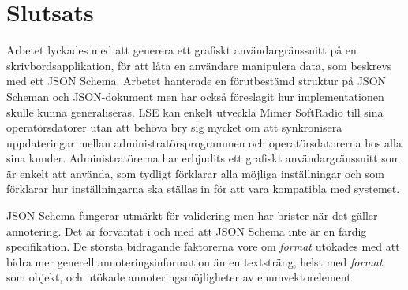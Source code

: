 \section{Slutsats}
\label{sec:slutsats:slutsats}
Arbetet lyckades med att generera ett grafiskt användargränssnitt på en skrivbordsapplikation, för att låta en användare manipulera data, som beskrevs med ett JSON Schema. Arbetet hanterade en förutbestämd struktur på JSON Scheman och JSON-dokument men har också föreslagit hur implementationen skulle kunna generaliseras. LSE kan enkelt utveckla Mimer SoftRadio till sina operatörsdatorer utan att behöva bry sig mycket om att synkronisera uppdateringar mellan administratörsprogrammen och operatörsdatorerna hos alla sina kunder. Administratörerna har erbjudits ett grafiskt användargränssnitt som är enkelt att använda, som tydligt förklarar alla möjliga inställningar och som förklarar hur inställningarna ska ställas in för att vara kompatibla med systemet.

JSON Schema fungerar utmärkt för validering men har brister när det gäller annotering. Det är förväntat i och med att JSON Schema inte är en färdig specifikation. De största bidragande faktorerna vore om \textit{format} utökades med att bidra mer generell annoteringsinformation än en textsträng, helst med \textit{format} som objekt, och utökade annoteringsmöjligheter av enumvektorelement